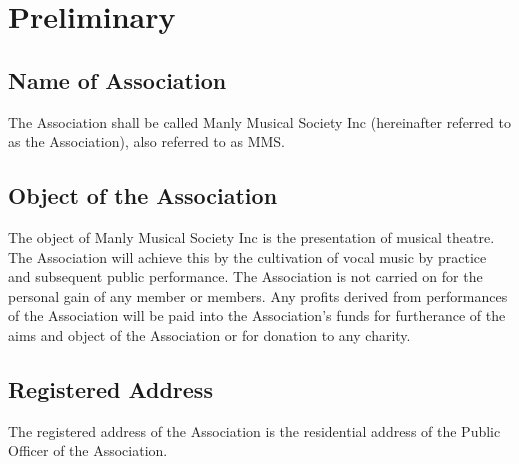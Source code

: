 \section{Preliminary}

\subsection{Name of Association}
The Association shall be called Manly Musical Society Inc (hereinafter referred to as the Association), also referred to as MMS.
\subsection{Object of the Association}
The object of Manly Musical Society Inc is the presentation of musical theatre.  The Association will achieve this by the cultivation of vocal music by practice and subsequent public performance.  The Association is not carried on for the personal gain of any member or members.  Any profits derived from performances of the Association will be paid into the Association’s funds for furtherance of the aims and object of the Association or for donation to any charity.
\subsection{Registered Address}
The registered address of the Association is the residential address of the Public Officer of the Association.
